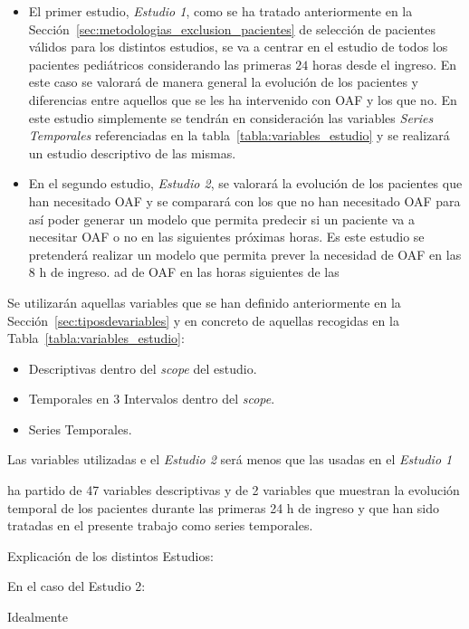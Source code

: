 \begin{itemize}
    \item El primer estudio, \textit{Estudio 1}, como se ha tratado anteriormente en la Sección~\ref{sec:metodologias_exclusion_pacientes} de selección de pacientes válidos para los distintos estudios, se va a centrar en el estudio de todos los pacientes pediátricos considerando las primeras $24$ horas desde el ingreso. En este caso se valorará de manera general la evolución de los pacientes y diferencias entre aquellos que se les ha intervenido con OAF y los que no. En este estudio simplemente se tendrán en consideración las variables \textit{Series Temporales} referenciadas en la tabla~\ref{tabla:variables_estudio} y se realizará un estudio descriptivo de las mismas.
    \item  En el segundo estudio, \textit{Estudio 2}, se valorará la evolución de los pacientes que han necesitado OAF y se comparará con los que no han necesitado OAF para así poder generar un modelo que permita predecir si un paciente va a necesitar OAF o no en las siguientes próximas horas. Es este estudio se pretenderá realizar un modelo que permita prever la necesidad de OAF en las 8 h de ingreso. ad de OAF en las horas siguientes de las 
\end{itemize}

Se utilizarán aquellas variables que se han definido anteriormente en la Sección~\ref{sec:tiposdevariables} y en concreto de aquellas recogidas en la Tabla~\ref{tabla:variables_estudio}:

\begin{itemize}
    \item Descriptivas dentro del \textit{scope} del estudio.
    \item Temporales en $3$ Intervalos dentro del \textit{scope}.
    \item Series Temporales.
\end{itemize}

Las variables utilizadas e el \textit{Estudio 2} será menos que las usadas en el \textit{Estudio 1}

ha partido de 47 variables descriptivas y de 2 variables que muestran la evolución temporal de los pacientes durante las primeras 24 h de ingreso y que han sido tratadas en el presente trabajo como series temporales. 


Explicación de los distintos Estudios:


En el caso del Estudio 2:

Idealmente 



